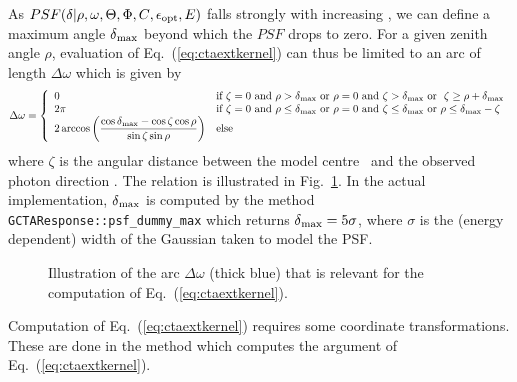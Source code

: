 \documentclass{article}[12pt,a4]
\begin{document}
As $PSF(\mbox{$\delta$} | \rho, \omega, \mbox{$\Theta$}, \mbox{$\Phi$}, \mbox{$C$}, \mbox{$\epsilon_{\rm opt}$}, E)$ falls strongly with increasing
\psfsep, we can define a maximum angle $\mbox{$\delta$}_{\rm max}$ beyond
which the $PSF$ drops to zero.
For a given zenith angle $\rho$, evaluation of Eq.~(\ref{eq:ctaextkernel}) can thus be limited 
to an arc of length
$\Delta \omega$
which is given by
\begin{equation}
\Delta \omega = \left \{
\begin{array}{l l}
\displaystyle
0 & \mbox{if $\zeta = 0$ and $\rho > \mbox{$\delta$}_{\rm max}$ or $\rho = 0$ and $\zeta > \mbox{$\delta$}_{\rm max}$ or $\ \zeta \ge \rho + \mbox{$\delta$}_{\rm max}$} \\
2 \pi & \mbox{if $\zeta = 0$ and $\rho \le \mbox{$\delta$}_{\rm max}$ or $\rho = 0$ and $\zeta \le \mbox{$\delta$}_{\rm max}$ or $\rho \le \mbox{$\delta$}_{\rm max}-\zeta $} \\
\displaystyle
2 \arccos \left ( 
\frac{\cos \mbox{$\delta$}_{\rm max} - \cos \zeta \cos \rho}
        {\sin \zeta \sin \rho} 
\right) & \mbox{else}
\end{array}
\right.
\label{eq:ctaextarc}
\end{equation}
where
$\zeta$ is the angular distance between the model centre \mdir\ and the observed photon direction \phdir.
The relation is illustrated in Fig.~\ref{fig:ctapsfarc}.
In the actual implementation, $\mbox{$\delta$}_{\rm max}$ is computed by the method
{\tt GCTAResponse::psf\_dummy\_max}
which returns $\mbox{$\delta$}_{\rm max} = 5 \sigma$, where $\sigma$ is the (energy dependent)
width of the Gaussian taken to model the PSF.

\begin{figure}[!t]
\center
{}
\caption{Illustration of the arc $\Delta \omega$ (thick blue) that is relevant for the computation
of Eq.~(\ref{eq:ctaextkernel}).
}
 \label{fig:ctapsfarc}
\end{figure}

Computation of Eq.~(\ref{eq:ctaextkernel}) requires some coordinate transformations.
These are done in the method which computes
the argument of Eq.~(\ref{eq:ctaextkernel}).
\end{document}
